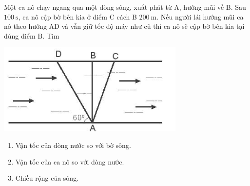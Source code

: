 \begin{ex}
	Một ca nô chạy ngang qua một dòng sông, xuất phát từ A, hướng mũi về B. Sau $\SI{100}{\second}$, ca nô cập bờ bên kia ở điểm C cách B $\SI{200}{\meter}$. Nếu người lái hướng mũi ca nô theo hướng AD và vẫn giữ tốc độ máy như cũ thì ca nô sẽ cập bờ bên kia tại đúng điểm B. Tìm
	\begin{center}
		\includegraphics[scale=0.35]{figs/G10Y25B5-10}
	\end{center}
	\begin{enumerate}[label=\alph*)]
		\item Vận tốc của dòng nước so với bờ sông.
		\item Vận tốc của ca nô so với dòng nước.
		\item Chiều rộng của sông.
	\end{enumerate}
\end{ex}
